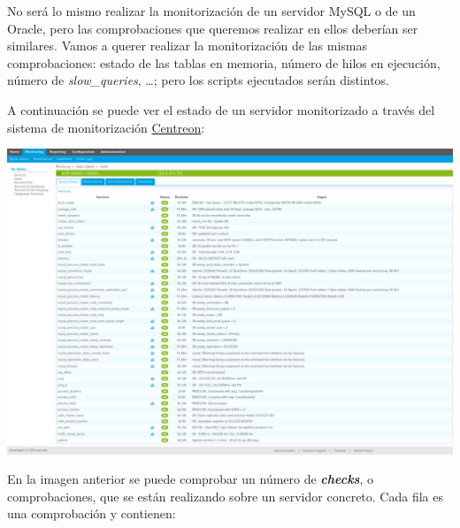 No será lo mismo realizar la monitorización de un servidor MySQL o de un Oracle, pero las comprobaciones que queremos realizar en ellos deberían ser similares. Vamos a querer realizar la monitorización de las mismas comprobaciones: estado de las tablas en memoria, número de hilos en ejecución, número de \textit{slow\_queries}, …; pero los scripts ejecutados serán distintos.


A continuación se puede ver el estado de un servidor monitorizado a través del sistema de monitorización \href{https://www.centreon.com/}{Centreon}:

\begin{tcolorbox}[colback=white,title=Servidor monitorizado en Centreon]
  \includegraphics[width=\linewidth]{centreon.png}
\end{tcolorbox}



En la imagen anterior se puede comprobar un número de \textbf{\textit{checks}}, o comprobaciones, que se están realizando sobre un servidor concreto. Cada fila es una comprobación y contienen:

